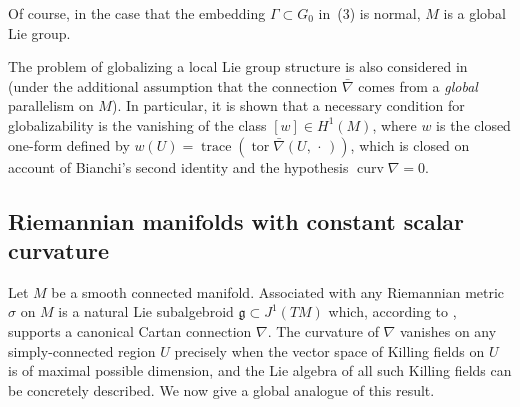 \documentclass[pdftex]{sigma}
\DeclareMathOperator{\trace}{trace}
\DeclareMathOperator{\curvature}{curv}
\DeclareMathOperator{\torsion}{tor}
\numberwithin{equation}{section}
\begin{document}
Of course, in the case that the embedding $\Gamma \subset G_0$ in~(3) %
is normal, $M$ is a global Lie group.

The problem of globalizing a local Lie group structure is also
considered in \cite{Abadoglu_Ortacgil_10} (under the additional
assumption that the connection $\bar\nabla $ comes from a {\it global}
parallelism on $M$). In particular, it is shown that a necessary
condition for globalizability is the vanishing of the class $[w] \in
H^1(M)$, where $w$ is the closed one-form def\/ined by
$w(U)=\trace(\torsion \bar\nabla (U,\,\cdot \,))$, which is closed on
account of Bianchi's second identity and the hypothesis $\curvature
\nabla =0$.

\subsection{Riemannian manifolds with constant scalar curvature}
Let $M$ be a smooth connected manifold. Associated with any Riemannian
metric $\sigma$ on $M$ is a natural Lie subalgebroid ${\mathfrak g}
\subset J^1 ({TM})$ which, according to \cite{Blaom_12}, supports a
canonical Cartan connection $\nabla $. The curvature of $\nabla $
vanishes on any simply-connected region $U$ precisely when the vector
space of Killing f\/ields on $U$ is of maximal possible dimension, and
the Lie algebra of all such Killing f\/ields can be concretely
described. We now give a global analogue of this result.
\end{document}
